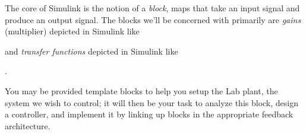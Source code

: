 The core of Simulink is the notion of a \emph{block}, maps that take an input
signal and produce an output signal.
The blocks we'll be concerned with primarily are \emph{gains}
(multiplier) depicted in Simulink like
\begin{center}
\end{center}
and \emph{transfer functions} depicted in Simulink like
\begin{center}
  .
\end{center}
You may be provided template blocks to help you setup the Lab plant, the
system we wish to control; it will then be your task to analyze this block,
design a controller, and implement it by linking up blocks
in the appropriate feedback architecture.


